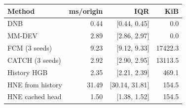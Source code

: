 \begin{tabular*}{\linewidth}{@{\extracolsep{\fill}}lrrr@{}}
\toprule
Method & ms/origin & IQR & KiB \\
\midrule
DNB & 0.44 & [0.44, 0.45] & 0.0 \\
MM-DEV & 2.89 & [2.86, 2.97] & 0.0 \\
FCM (3 seeds) & 9.23 & [9.12, 9.33] & 17422.3 \\
CATCH (3 seeds) & 2.92 & [2.90, 2.95] & 13113.5 \\
History HGB & 2.35 & [2.21, 2.39] & 469.1 \\
HNE from history & 31.49 & [30.14, 31.81] & 154.5 \\
HNE cached head & 1.50 & [1.38, 1.52] & 154.5 \\
\bottomrule
\end{tabular*}